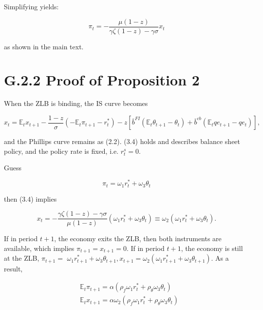 \documentclass[10pt]{article}
\begin{document}
Simplifying yields:

\begin{equation*}
\pi_{t}=-\frac{\mu(1-z)}{\gamma \zeta(1-z)-\gamma \sigma} x_{t} \tag{G.16}
\end{equation*}

as shown in the main text.

\section*{G.2.2 Proof of Proposition 2}
When the ZLB is binding, the IS curve becomes

\begin{equation*}
x_{t}=\mathbb{E}_{t} x_{t+1}-\frac{1-z}{\sigma}\left(-\mathbb{E}_{t} \pi_{t+1}-r_{t}^{*}\right)-z\left[\bar{b}^{F I}\left(\mathbb{E}_{t} \theta_{t+1}-\theta_{t}\right)+\bar{b}^{c b}\left(\mathbb{E}_{t} q e_{t+1}-q e_{t}\right)\right], \tag{G.17}
\end{equation*}

and the Phillips curve remains as (2.2). (3.4) holds and describes balance sheet policy, and the policy rate is fixed, i.e. $r_{t}^{s}=0$.

Guess

\begin{equation*}
\pi_{t}=\omega_{1} r_{t}^{*}+\omega_{3} \theta_{t}
\end{equation*}

then (3.4) implies

\begin{equation*}
x_{t}=-\frac{\gamma \zeta(1-z)-\gamma \sigma}{\mu(1-z)}\left(\omega_{1} r_{t}^{*}+\omega_{3} \theta_{t}\right) \equiv \omega_{2}\left(\omega_{1} r_{t}^{*}+\omega_{3} \theta_{t}\right) .
\end{equation*}

If in period $t+1$, the economy exits the ZLB, then both instruments are available, which implies $\pi_{t+1}=x_{t+1}=0$. If in period $t+1$, the economy is still at the ZLB, $\pi_{t+1}=$ $\omega_{1} r_{t+1}^{*}+\omega_{3} \theta_{t+1}, x_{t+1}=\omega_{2}\left(\omega_{1} r_{t+1}^{*}+\omega_{3} \theta_{t+1}\right)$. As a result,

\begin{equation*}
\begin{aligned}
& \mathbb{E}_{t} \pi_{t+1}=\alpha\left(\rho_{f} \omega_{1} r_{t}^{*}+\rho_{\theta} \omega_{3} \theta_{t}\right) \\
& \mathbb{E}_{t} x_{t+1}=\alpha \omega_{2}\left(\rho_{f} \omega_{1} r_{t}^{*}+\rho_{\theta} \omega_{3} \theta_{t}\right)
\end{aligned}
\end{equation*}
\end{document}
